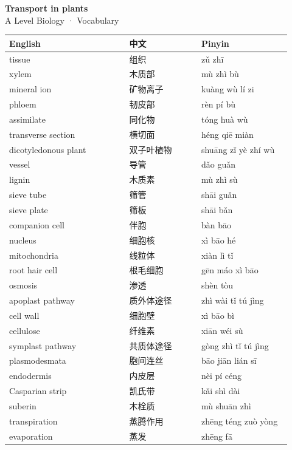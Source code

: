 \documentclass[11pt]{article}
\begin{document}
\begin{center}
  {\LARGE\bfseries Transport in plants}\\[0.35em]
  {\large A Level Biology · Vocabulary}
\end{center}
\vspace{0.6em}

\begin{longtable}{@{}p{0.40\linewidth}p{0.24\linewidth}p{0.30\linewidth}@{}}
\toprule
\textbf{English} & \textbf{中文} & \textbf{Pinyin} \\
\midrule
\endhead
\bottomrule
\endlastfoot
tissue & 组织 & zǔ zhī \\
xylem & 木质部 & mù zhì bù \\
mineral ion & 矿物离子 & kuàng wù lí zi \\
phloem & 韧皮部 & rèn pí bù \\
assimilate & 同化物 & tóng huà wù \\
transverse section & 横切面 & héng qiē miàn \\
dicotyledonous plant & 双子叶植物 & shuāng zǐ yè zhí wù \\
vessel & 导管 & dǎo guǎn \\
lignin & 木质素 & mù zhì sù \\
sieve tube & 筛管 & shāi guǎn \\
sieve plate & 筛板 & shāi bǎn \\
companion cell & 伴胞 & bàn bāo \\
nucleus & 细胞核 & xì bāo hé \\
mitochondria & 线粒体 & xiàn lì tǐ \\
root hair cell & 根毛细胞 & gēn máo xì bāo \\
osmosis & 渗透 & shèn tòu \\
apoplast pathway & 质外体途径 & zhì wài tǐ tú jìng \\
cell wall & 细胞壁 & xì bāo bì \\
cellulose & 纤维素 & xiān wéi sù \\
symplast pathway & 共质体途径 & gòng zhì tǐ tú jìng \\
plasmodesmata & 胞间连丝 & bāo jiān lián sī \\
endodermis & 内皮层 & nèi pí céng \\
Casparian strip & 凯氏带 & kǎi shì dài \\
suberin & 木栓质 & mù shuān zhì \\
transpiration & 蒸腾作用 & zhēng téng zuò yòng \\
evaporation & 蒸发 & zhēng fā \\

\end{longtable}
\end{document}
